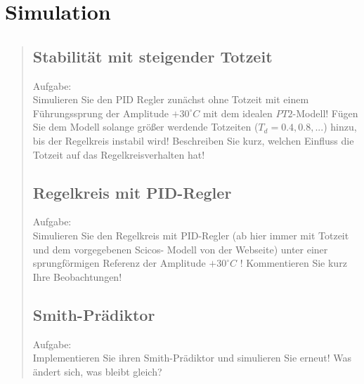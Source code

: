 \section{Simulation}
\begin{quote}
    
    \subsection{Stabilität mit steigender Totzeit}
    Aufgabe:\\
    Simulieren Sie den PID Regler zunächst ohne Totzeit mit einem Führungssprung der Amplitude $+30^{\circ}C$ mit dem
    idealen $PT2$-Modell! Fügen Sie dem Modell solange größer werdende Totzeiten ($T_d = 0.4, 0.8, . . .$) hinzu, bis
    der Regelkreis instabil wird! Beschreiben Sie kurz, welchen Einfluss die Totzeit auf das Regelkreisverhalten
    hat!\vspace{1em}
    
    \begin{quote}
    
    \end{quote}
    
    \subsection{Regelkreis mit PID-Regler}
    Aufgabe:\\
    Simulieren Sie den Regelkreis mit PID-Regler (ab hier immer mit Totzeit und dem vorgegebenen Scicos- Modell von der
    Webseite) unter einer sprungförmigen Referenz der Amplitude $+30^{\circ}C$ ! Kommentieren Sie kurz Ihre
    Beobachtungen!\vspace{1em}
    
    \begin{quote}
        
    \end{quote}
    
    
    \subsection{Smith-Prädiktor}
    Aufgabe:\\
    Implementieren Sie ihren Smith-Prädiktor und simulieren Sie erneut! Was ändert sich, was bleibt gleich?\vspace{1em}
    
    \begin{quote}
        
    \end{quote}
    

\end{quote}
